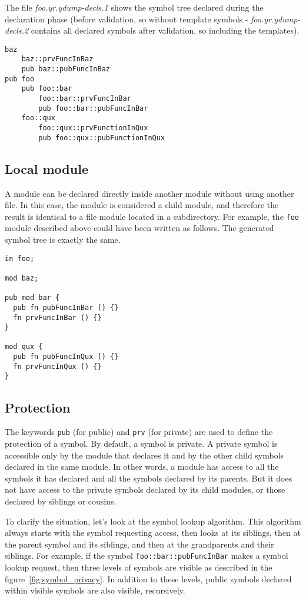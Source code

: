 The file \textit{foo.yr.ydump-decls.1} shows the symbol tree declared during the
declaration phase (before validation, so without template symbols -
\textit{foo.yr.ydump-decls.2} contains all declared symbols after validation, so
including the templates).

\begin{lstlisting}[style=intermediateVerb]
baz
    baz::prvFuncInBaz
    pub baz::pubFuncInBaz
pub foo
    pub foo::bar
        foo::bar::prvFuncInBar
        pub foo::bar::pubFuncInBar
    foo::qux
        foo::qux::prvFunctionInQux
        pub foo::qux::pubFunctionInQux
\end{lstlisting}

\subsection{Local module}

A module can be declared directly inside another module without using another
file. In this case, the module is considered a child module, and therefore the
result is identical to a file module located in a subdirectory. For example, the
\texttt{foo} module described above could have been written as follows. The
generated symbol tree is exactly the same.

\begin{lstlisting}[style=coloredverbatim]
in foo;

mod baz;

pub mod bar {
  pub fn pubFuncInBar () {}
  fn prvFuncInBar () {}
}

mod qux {
  pub fn pubFuncInQux () {}
  fn prvFuncInQux () {}
}
\end{lstlisting}

\subsection{Protection}

The keywords \texttt{pub} (for public) and \texttt{prv} (for private) are used
to define the protection of a symbol. By default, a symbol is private. A private
symbol is accessible only by the module that declares it and by the other child
symbols declared in the same module. In other words, a module has access to all
the symbols it has declared and all the symbols declared by its parents. But it
does not have access to the private symbols declared by its child modules, or
those declared by siblings or cousins.

To clarify the situation, let's look at the symbol lookup algorithm. This
algorithm always starts with the symbol requesting access, then looks at its
siblings, then at the parent symbol and its siblings, and then at the
grandparents and their siblings. For example, if the symbol
\texttt{foo::bar::pubFuncInBar} makes a symbol lookup request, then three levels
of symbols are visible as described in the figure~\ref{fig:symbol_privacy}. In
addition to these levels, public symbols declared within visible symbols are
also visible, recursively.

